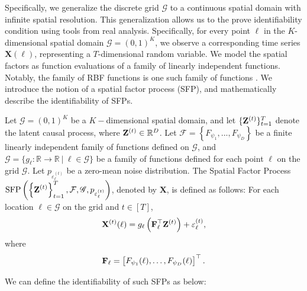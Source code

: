 Specifically, we generalize the discrete grid $\mathcal{G}$ to a continuous spatial domain with infinite spatial resolution. This generalization allows us to the prove identifiability condition using tools from real analysis.  Specifically, for every point $\ell$ in the $K$-dimensional spatial domain $\mathcal{G} = (0,1)^K$, we observe a corresponding time series $\mathbf{X}(\ell)$, representing a $T$-dimensional random variable. We model the spatial factors as function evaluations of a family of linearly independent functions. Notably, the family of RBF functions is one such family of functions \citep{smola1998learning}. We introduce the notion of a spatial factor process (SFP), and mathematically describe the identifiability of SFPs.
\begin{definition}
    \label{def:spatial_factor_process}
    Let $\mathcal{G} = (0,1)^K$ be a $K-$dimensional spatial domain, and let $\{\mathbf{Z}^{(t)}\}_{t=1}^T$ denote the latent causal process, where $\mathbf{Z}^{(t)} \in \mathbb{R}^D$. Let $\mathcal{F} = \left\{F_{\psi_1}, ..., F_{\psi_D} \right\}$ be a finite linearly independent family of functions defined on $\mathcal{G}$, and $\mathscr{G} = \big\{ g_{\ell} \colon \mathbb{R} \to \mathbb{R} \ \big| \ \ell \in \mathcal{G} \big\}$ be a family of functions defined for each point $\ell$ on the grid $\mathcal{G}$. Let $p_{\varepsilon_{\ell}^{(t)}}$ be a zero-mean noise distribution. The Spatial Factor Process $\displaystyle \text{SFP}\left(\left\{\mathbf{Z}^{(t)}\right\}_{t=1}^T, \mathcal{F}, \mathscr{G}, p_{\varepsilon_{\ell}^{(t)}} \right)$, denoted by $\mathbf{X}$, is defined as follows: For each location $\ell \in \mathcal{G}$ on the grid and $t \in [T]$,
\begin{equation} \mathbf{X}^{(t)} (\ell) = g_{\ell} \left (\mathbf{F}_{\ell}^\top \mathbf{Z}^{(t)} \right) + \varepsilon_{\ell}^{(t)}, \label{eqn:x_eqn_2}
    \end{equation}
    where
    \begin{equation*}
        \mathbf{F}_{\ell} = \begin{bmatrix}
            F_{\psi_1}(\ell), \ldots, F_{\psi_D}(\ell)
        \end{bmatrix}^\top.
    \end{equation*}
\end{definition}
We can define the identifiability of such SFPs as below:
